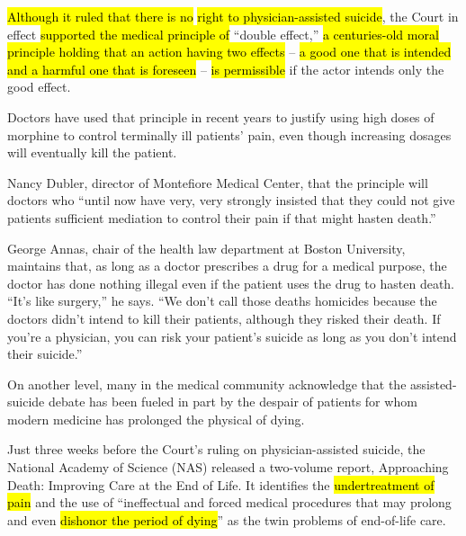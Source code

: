  \hl{Although it ruled that there is no} 
\hl{right to physician-assisted suicide}, the Court in effect 
\hl{supported the medical principle of} 
“double effect,” 
\hl{a centuries-old moral principle holding that an action having two effects} -- 
\hl{a good one that is intended and a harmful one that is foreseen}  -- \hl{is permissible} if the actor intends only the good effect.

Doctors have used that principle in recent years to justify using high doses of 
morphine to control 
terminally ill patients’ pain, even though increasing 
dosages will eventually kill the patient.

Nancy Dubler, director of Montefiore Medical Center, 
 that the principle will 
 doctors who “until now have very, very strongly insisted that they could not give patients sufficient mediation to control their pain if that might 
hasten death.”

George Annas, chair of the health law department at Boston University, 
maintains that, as long as a doctor 
prescribes a drug for a 
 medical purpose, the doctor has done nothing illegal even if the patient uses the drug to hasten death. “It’s like surgery,” he says. “We don’t call those deaths 
homicides because the doctors didn’t intend to kill their patients, although they risked their death. If you’re a physician, you can risk your patient’s suicide as long as you don’t intend their suicide.”

On another level, many in the medical community acknowledge that the assisted-suicide debate has been fueled in part by the despair of patients for whom modern medicine has prolonged the physical 
 of dying.

Just three weeks before the Court’s ruling on physician-assisted suicide, the National Academy of Science (NAS) released a two-volume report, Approaching Death: Improving Care at the End of Life. It identifies the 
\hl{undertreatment of pain} and the 
 use of “ineffectual and forced medical procedures that 
may prolong and even 
\hl{dishonor the period of dying}” as the twin problems of end-of-life care.

